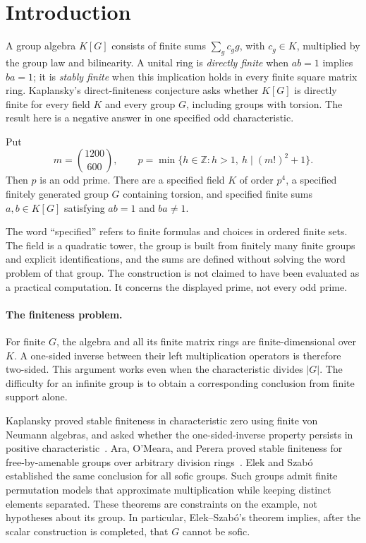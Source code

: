 \section{Introduction}
\label{op:introduction}

A group algebra $K[G]$ consists of finite sums $\sum_g c_g g$, with
$c_g\in K$, multiplied by the group law and bilinearity. A unital ring is
\emph{directly finite} when $ab=1$ implies $ba=1$; it is \emph{stably
finite} when this implication holds in every finite square matrix ring.
Kaplansky's direct-finiteness conjecture asks whether $K[G]$ is directly
finite for every field $K$ and every group $G$, including groups with
torsion. The result here is a negative answer in one specified
odd characteristic.

\begin{theorem}\label{op:main}
Put
\[
 m=\binom{1200}{600},\qquad
 p=\min\{h\in\mathbb Z:h>1,\ h\mid(m!)^2+1\}.
\]
Then $p$ is an odd prime. There are a specified field $K$ of order $p^4$,
a specified finitely generated group $G$ containing torsion, and specified
finite sums $a,b\in K[G]$ satisfying $ab=1$ and $ba\ne1$.
\end{theorem}

The word ``specified'' refers to finite formulas and choices in ordered
finite sets. The field is a quadratic tower, the group is built from
finitely many finite groups and explicit identifications, and the sums
are defined without solving the word problem of that group. The
construction is not claimed to have been evaluated as a practical
computation. It concerns the displayed prime, not every odd prime.

\paragraph{The finiteness problem.}
For finite $G$, the algebra and all its finite matrix rings are
finite-dimensional over $K$. A one-sided inverse between their left
multiplication operators is therefore two-sided. This argument works even
when the characteristic divides $|G|$. The difficulty for an infinite
group is to obtain a corresponding conclusion from finite support alone.

Kaplansky proved stable finiteness in characteristic zero using finite
von Neumann algebras, and asked whether the one-sided-inverse property
persists in positive characteristic~\cite[pp.~122--123]{Kaplansky1972}.
Ara, O'Meara, and Perera proved stable finiteness for free-by-amenable
groups over arbitrary division rings~\cite{AraOMearaPerera2002}.
Elek and Szab\'o~\cite[Corollary~4.7]{ElekSzabo2004} established the
same conclusion for all sofic groups. Such groups admit finite
permutation models that approximate multiplication while keeping
distinct elements separated.
These theorems are constraints on the example, not hypotheses about its
group. In particular, Elek--Szab\'o's theorem implies, after the scalar
construction is completed, that $G$ cannot be sofic.


